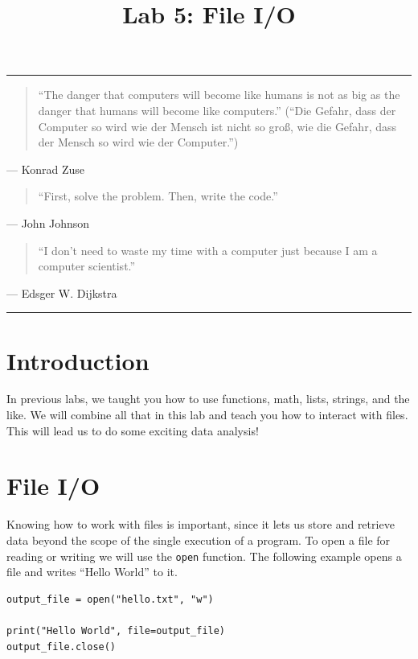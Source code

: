 \documentclass[11pt]{cselabheader}
\title{Lab 5: File I/O}
\begin{document}
\maketitle

\hrule
\begin{quotation}
``The danger that computers will become like humans is not as big as the danger
that humans will become like computers.'' (``Die Gefahr, dass der Computer so
wird wie der Mensch ist nicht so gro\ss, wie die Gefahr, dass der Mensch so wird
wie der Computer.'')
\end{quotation}
\begin{flushright}
--- Konrad Zuse
\end{flushright}

\begin{quotation}
	``First, solve the problem. Then, write the code.''
\end{quotation}
\begin{flushright}
	--- John Johnson
\end{flushright}

\begin{quotation}
``I don’t need to waste my time with a computer just because I am a computer
scientist.''
\end{quotation}
\begin{flushright}
--- Edsger W. Dijkstra
\end{flushright}

\hrule

\section{Introduction}
In previous labs, we taught you how to use functions, math, lists, strings, and
the like. We will combine all that in this lab and teach you how to interact
with files. This will lead us to do some exciting data analysis!

\section{File I/O}
Knowing how to work with files is important, since it lets us store and retrieve
data beyond the scope of the single execution of a program. To open a file for
reading or writing we will use the \lstinline{open} function. The following
example opens a file and writes ``Hello World'' to it.

\begin{lstlisting}[style=python]
output_file = open("hello.txt", "w")

print("Hello World", file=output_file)
output_file.close()
\end{lstlisting}
\end{document}
